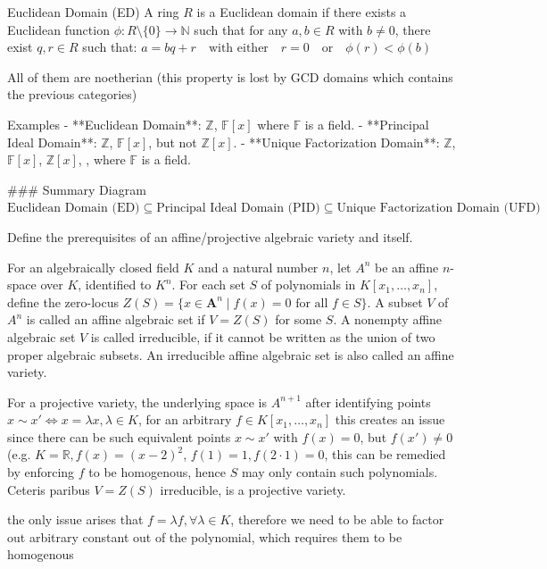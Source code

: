 Euclidean Domain (ED)
A ring \( R \) is a Euclidean domain if there exists a Euclidean function \( \phi: R \setminus \{0\} \to \mathbb{N} \) such that for any \( a, b \in R \) with \( b \neq 0 \), there exist \( q, r \in R \) such that:
\( 
a = bq + r \quad \text{with either} \quad r = 0 \quad \text{or} \quad \phi(r) < \phi(b)
\) 

All of them are noetherian (this property is lost 
by GCD domains which contains the previous categories)

Examples
- **Euclidean Domain**: \(\mathbb{Z}\), \( \mathbb{F}[x] \) where \( \mathbb{F} \) is a field.
- **Principal Ideal Domain**: \(\mathbb{Z}\), \( \mathbb{F}[x] \), but not \(\mathbb{Z}[x]\).
- **Unique Factorization Domain**: \(\mathbb{Z}\), \( \mathbb{F}[x] \), \(\mathbb{Z}[x]\), , where \( \mathbb{F} \) is a field.

### Summary Diagram
\( \text{Euclidean Domain (ED)} \subseteq \text{Principal Ideal Domain (PID)} \subseteq \text{Unique Factorization Domain (UFD)}\) 


Define the prerequisites of an affine/projective algebraic variety and itself.


For an algebraically closed field \(K\) and a natural number \(n\), let \(A^n\) be an affine \(n\)-space over \(K\), identified to 
\(K^{n}\). For each set \(S\) of polynomials in \(K[x_1, \dots, x_n]\), define the zero-locus \(Z(S)= \{ x\in \mathbf{A} ^{n}\mid f(x)=0{\text{ for all }}f\in S\}\).
A subset \(V\) of \(A^n\) is called an affine algebraic set if \(V = Z(S)\) for some \(S\).
A nonempty affine algebraic set \(V\) is called irreducible, if it cannot be written as the union of two proper algebraic subsets.
An irreducible affine algebraic set is also called an affine variety.

For a projective variety, the underlying space is \(A^{n+1}\) after identifying points \(x \sim x' \iff x = \lambda x, \lambda \in K\), for an arbitrary \(f \in K[x_1, \dots, x_n]\) this creates an issue since there can be such equivalent points \(x \sim x'\) with \(f(x) = 0\), but \(f(x') \neq 0\) (e.g. \(K = \mathbb{R}, f(x) = (x - 2)^2\), \(f(1) = 1, f(2 \cdot 1) = 0\), this can be remedied by enforcing \(f\) to be homogenous, hence \(S\) may only contain such polynomials. Ceteris paribus \(V = Z(S)\) irreducible, is a projective variety.



the only issue arises that \(f = \lambda f, \forall \lambda \in K\), therefore we need to be able to factor out arbitrary constant
out of the polynomial, which requires them to be homogenous



